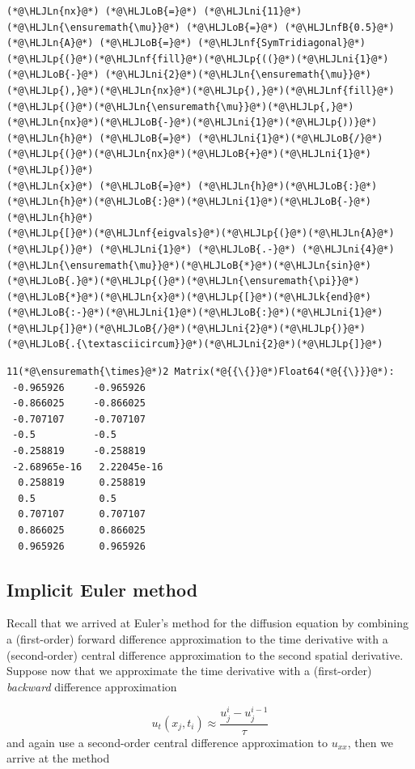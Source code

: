 \documentclass[12pt,a4paper]{article}
\newcommand{\HLJLk}[1]{\textcolor[RGB]{148,91,176}{\textbf{#1}}}
\newcommand{\HLJLn}[1]{#1}
\newcommand{\HLJLnf}[1]{\textcolor[RGB]{66,102,213}{#1}}
\newcommand{\HLJLnfB}[1]{\textcolor[RGB]{59,151,46}{#1}}
\newcommand{\HLJLni}[1]{\textcolor[RGB]{59,151,46}{#1}}
\newcommand{\HLJLoB}[1]{\textcolor[RGB]{102,102,102}{\textbf{#1}}}
\newcommand{\HLJLp}[1]{#1}
\begin{document}
\begin{lstlisting}
(*@\HLJLn{nx}@*) (*@\HLJLoB{=}@*) (*@\HLJLni{11}@*)
(*@\HLJLn{\ensuremath{\mu}}@*) (*@\HLJLoB{=}@*) (*@\HLJLnfB{0.5}@*)
(*@\HLJLn{A}@*) (*@\HLJLoB{=}@*) (*@\HLJLnf{SymTridiagonal}@*)(*@\HLJLp{(}@*)(*@\HLJLnf{fill}@*)(*@\HLJLp{((}@*)(*@\HLJLni{1}@*) (*@\HLJLoB{-}@*) (*@\HLJLni{2}@*)(*@\HLJLn{\ensuremath{\mu}}@*)(*@\HLJLp{),}@*)(*@\HLJLn{nx}@*)(*@\HLJLp{),}@*)(*@\HLJLnf{fill}@*)(*@\HLJLp{(}@*)(*@\HLJLn{\ensuremath{\mu}}@*)(*@\HLJLp{,}@*)(*@\HLJLn{nx}@*)(*@\HLJLoB{-}@*)(*@\HLJLni{1}@*)(*@\HLJLp{))}@*)
(*@\HLJLn{h}@*) (*@\HLJLoB{=}@*) (*@\HLJLni{1}@*)(*@\HLJLoB{/}@*)(*@\HLJLp{(}@*)(*@\HLJLn{nx}@*)(*@\HLJLoB{+}@*)(*@\HLJLni{1}@*)(*@\HLJLp{)}@*)
(*@\HLJLn{x}@*) (*@\HLJLoB{=}@*) (*@\HLJLn{h}@*)(*@\HLJLoB{:}@*)(*@\HLJLn{h}@*)(*@\HLJLoB{:}@*)(*@\HLJLni{1}@*)(*@\HLJLoB{-}@*)(*@\HLJLn{h}@*)
(*@\HLJLp{[}@*)(*@\HLJLnf{eigvals}@*)(*@\HLJLp{(}@*)(*@\HLJLn{A}@*)(*@\HLJLp{)}@*) (*@\HLJLni{1}@*) (*@\HLJLoB{.-}@*) (*@\HLJLni{4}@*)(*@\HLJLn{\ensuremath{\mu}}@*)(*@\HLJLoB{*}@*)(*@\HLJLn{sin}@*)(*@\HLJLoB{.}@*)(*@\HLJLp{(}@*)(*@\HLJLn{\ensuremath{\pi}}@*)(*@\HLJLoB{*}@*)(*@\HLJLn{x}@*)(*@\HLJLp{[}@*)(*@\HLJLk{end}@*)(*@\HLJLoB{:-}@*)(*@\HLJLni{1}@*)(*@\HLJLoB{:}@*)(*@\HLJLni{1}@*)(*@\HLJLp{]}@*)(*@\HLJLoB{/}@*)(*@\HLJLni{2}@*)(*@\HLJLp{)}@*)(*@\HLJLoB{.{\textasciicircum}}@*)(*@\HLJLni{2}@*)(*@\HLJLp{]}@*)
\end{lstlisting}

\begin{lstlisting}
11(*@\ensuremath{\times}@*)2 Matrix(*@{{\{}}@*)Float64(*@{{\}}}@*):
 -0.965926     -0.965926
 -0.866025     -0.866025
 -0.707107     -0.707107
 -0.5          -0.5
 -0.258819     -0.258819
 -2.68965e-16   2.22045e-16
  0.258819      0.258819
  0.5           0.5
  0.707107      0.707107
  0.866025      0.866025
  0.965926      0.965926
\end{lstlisting}


\subsection{Implicit Euler method}
Recall that we arrived at Euler's method for the diffusion equation by combining a (first-order) forward difference approximation to the time derivative with a (second-order) central difference approximation to the second spatial derivative.  Suppose now that we approximate the time derivative with a (first-order) \emph{backward} difference approximation 

\[
u_t(x_j,t_i) \approx \frac{u^{i}_j - u^{i-1}_j}{\tau}
\]
and again use a second-order central difference approximation to $u_{xx}$, then we arrive at the method
\end{document}
